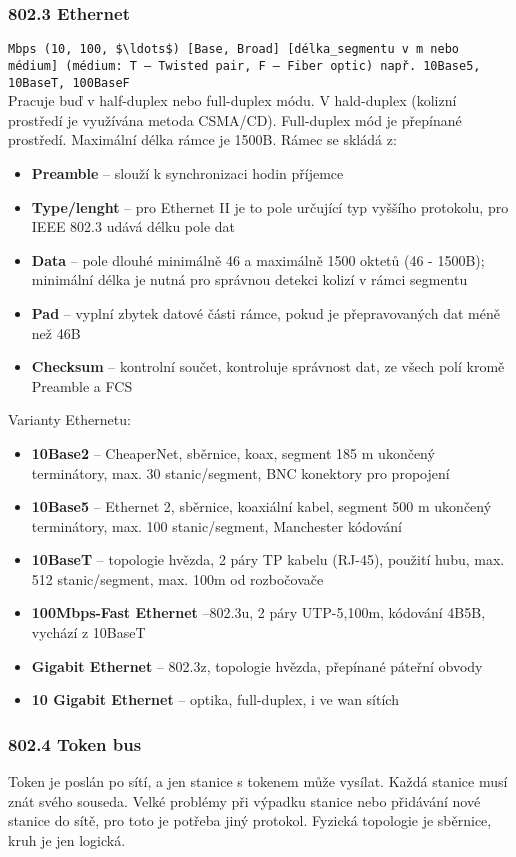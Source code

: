 \subsubsection{802.3 Ethernet} 
\verb|Mbps (10, 100, $\ldots$) [Base, Broad] [délka_segmentu v m nebo médium] (médium: T – Twisted pair, F – Fiber optic) např. 10Base5, 10BaseT, 100BaseF| \\
Pracuje buď v half-duplex nebo full-duplex módu. V hald-duplex (kolizní prostředí je využívána metoda CSMA/CD). Full-duplex mód je přepínané prostředí.
Maximální délka rámce je 1500B. Rámec se skládá z:
\begin{itemize}
\item \textbf{Preamble} -- slouží k synchronizaci hodin příjemce
\item \textbf{Type/lenght} -- pro Ethernet II je to pole určující typ vyššího protokolu, pro IEEE 802.3 udává délku pole dat
\item \textbf{Data} -- pole dlouhé minimálně 46 a maximálně 1500 oktetů (46 - 1500B); minimální délka je nutná pro správnou detekci kolizí v rámci segmentu
\item \textbf{Pad} -- vyplní zbytek datové části rámce, pokud je přepravovaných dat méně než 46B
\item \textbf{Checksum} -- kontrolní součet, kontroluje správnost dat, ze všech polí kromě Preamble a FCS
\end{itemize}

Varianty Ethernetu:
\begin{itemize}
\item \textbf{10Base2} -- CheaperNet, sběrnice, koax, segment 185 m ukončený terminátory, max. 30 stanic/segment, BNC konektory pro propojení
\item \textbf{10Base5} -- Ethernet 2, sběrnice, koaxiální kabel, segment 500 m ukončený terminátory, max. 100 stanic/segment, Manchester kódování
\item \textbf{10BaseT} -- topologie hvězda, 2 páry TP kabelu (RJ-45), použití hubu, max. 512 stanic/segment, max. 100m od rozbočovače
\item \textbf{100Mbps-Fast Ethernet} --802.3u, 2 páry UTP-5,100m, kódování 4B5B, vychází z 10BaseT
\item \textbf{Gigabit Ethernet} -- 802.3z, topologie hvězda, přepínané páteřní obvody
\item \textbf{10 Gigabit Ethernet} -- optika, full-duplex, i ve wan sítích
\end{itemize}

\subsubsection{802.4 Token bus} 
Token je poslán po sítí, a jen stanice s tokenem může vysílat. Každá stanice musí znát svého souseda. Velké problémy při výpadku stanice nebo přidávání nové stanice do sítě, pro toto je potřeba jiný protokol. Fyzická topologie je sběrnice, kruh je jen logická.

